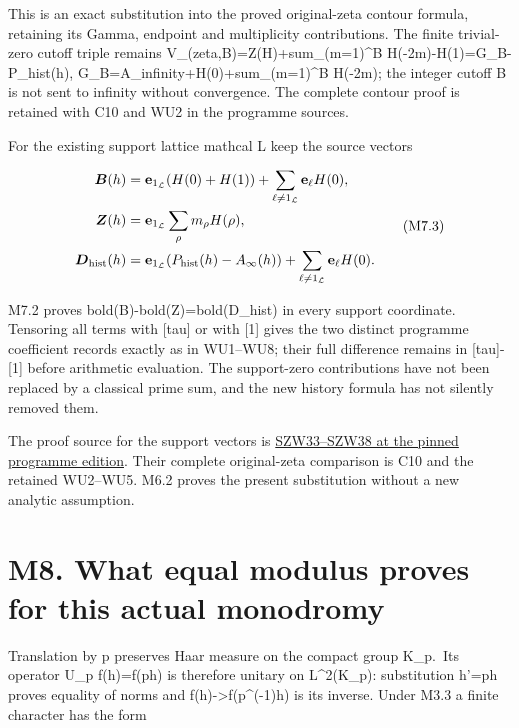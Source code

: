 This is an exact substitution into the proved original-zeta contour
formula, retaining its Gamma, endpoint and multiplicity contributions.
The finite trivial-zero cutoff triple remains
V\_(zeta,B)=Z(H)+sum\_(m=1)\^{}B H(-2m)-H(1)=G\_B-P\_hist(h),
G\_B=A\_infinity+H(0)+sum\_(m=1)\^{}B H(-2m); the integer cutoff B is
not sent to infinity without convergence. The complete contour proof is
retained with C10 and WU2 in the programme sources.

For the existing support lattice mathcal L keep the source vectors

\[
\begin{aligned}
\boldsymbol B(h)&=\mathbf e_{1_{\mathcal L}}(H(0)+H(1))
+\sum_{\ell\ne1_{\mathcal L}}\mathbf e_\ell H(0),\\
\boldsymbol Z(h)&=\mathbf e_{1_{\mathcal L}}\sum_\rho m_\rho H(\rho),\\
\boldsymbol D_{\rm hist}(h)&=\mathbf e_{1_{\mathcal L}}(P_{\rm hist}(h)-A_\infty(h))
+\sum_{\ell\ne1_{\mathcal L}}\mathbf e_\ell H(0).
\end{aligned}
\tag{M7.3}
\]

M7.2 proves bold(B)-bold(Z)=bold(D\_hist) in every support coordinate.
Tensoring all terms with {[}tau{]} or with {[}1{]} gives the two
distinct programme coefficient records exactly as in WU1--WU8; their
full difference remains in {[}tau{]}-{[}1{]} before arithmetic
evaluation. The support-zero contributions have not been replaced by a
classical prime sum, and the new history formula has not silently
removed them.

The proof source for the support vectors is
\href{https://github.com/KokunoYumeto/zeta-function-research-reader/blob/76f421965914beb133df797835f940849844dc4f/workbenches/splitzero-tandem/branches/tau-zero-prime-positivity/SUPPORTED_ZERO_PRIME_WEIL_DERIVATION.md}{SZW33--SZW38
at the pinned programme edition}. Their complete original-zeta
comparison is C10 and the retained WU2--WU5. M6.2 proves the present
substitution without a new analytic assumption.

\section{M8. What equal modulus proves for this actual
monodromy}\label{m8.-what-equal-modulus-proves-for-this-actual-monodromy}

Translation by p preserves Haar measure on the compact group K\_p.~Its
operator U\_p f(h)=f(ph) is therefore unitary on L\^{}2(K\_p):
substitution h'=ph proves equality of norms and
f(h)-\textgreater f(p\^{}(-1)h) is its inverse. Under M3.3 a finite
character has the form

